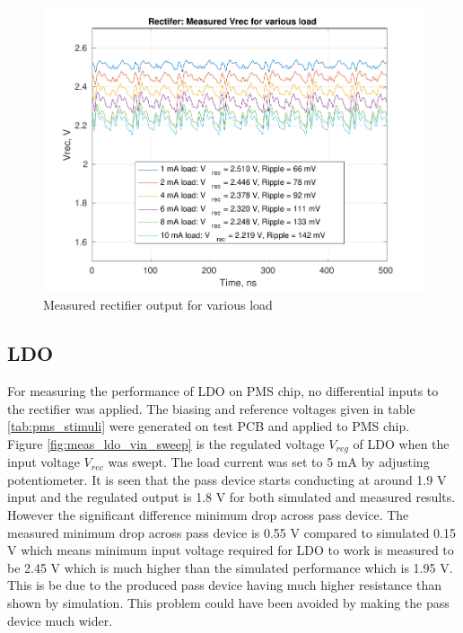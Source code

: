 \documentclass[UKenglish]{ifimaster}  %
\begin{document}
\begin{figure} [!htbp]
  \centering
  \includegraphics[width=\textwidth]{img/meas/rect_load_sweep.pdf} 
 \caption{Measured rectifier output for various load} 
\label{fig:meas_rect_load_sweep} 
\end{figure}

\subsection{LDO} %

For measuring the performance of LDO on PMS chip, no differential inputs to the rectifier was applied. The biasing and reference 
voltages given in table \ref{tab:pms_stimuli} were generated on test PCB and applied to PMS chip. \\

Figure \ref{fig:meas_ldo_vin_sweep} is the regulated voltage $V_{reg}$ of LDO when the input voltage $V_{rec}$ was swept. 
The load current was set to 5 mA by adjusting potentiometer. It is seen that the pass device starts conducting at around 
1.9 V input and the regulated output is 1.8 V for both simulated and measured results. However the significant difference 
minimum drop across pass device. The measured minimum drop across pass device is 0.55 V compared to simulated 0.15 V which 
means minimum input voltage required for LDO to work is measured to be 2.45 V which is much higher than the simulated 
performance which is 1.95 V. This is be due to the produced pass device having much higher resistance than shown by 
simulation. This problem could have been avoided by making the pass device much wider.
\end{document}
